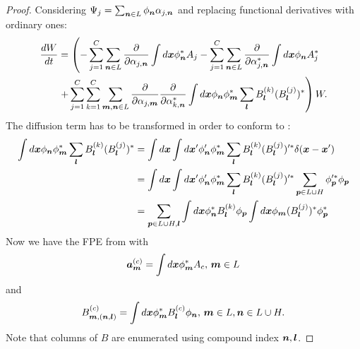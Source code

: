 \begin{proof}
Considering $\Psi_j = \sum_{\boldsymbol{n} \in L} \phi_{\boldsymbol{n}} \alpha_{j,\boldsymbol{n}}$ and replacing functional derivatives with ordinary ones:
\begin{equation*}
\begin{split}
	\frac{dW}{dt}
	& = \left(
		- \sum_{j=1}^C \sum_{\boldsymbol{n} \in L}
			\frac{\partial}{\partial \alpha_{j,\boldsymbol{n}}}
			\int d\boldsymbol{x} \phi_{\boldsymbol{n}}^* A_j
		- \sum_{j=1}^C \sum_{\boldsymbol{n} \in L}
			\frac{\partial}{\partial \alpha_{j,\boldsymbol{n}}^*}
			\int d\boldsymbol{x} \phi_{\boldsymbol{n}} A_j^*
		\right. \\
	&	\left. + \sum_{j=1}^C \sum_{k=1}^C
			\sum_{\boldsymbol{m},\boldsymbol{n} \in L}
			\frac{\partial}{\partial \alpha_{j,\boldsymbol{m}}}
			\frac{\partial}{\partial \alpha_{k,\boldsymbol{n}}^*}
			\int d\boldsymbol{x}
			\phi_{\boldsymbol{n}} \phi_{\boldsymbol{m}}^*
			\sum_{\boldsymbol{l}} B_{\boldsymbol{l}}^{(k)} (B_{\boldsymbol{l}}^{(j)})^*
	\right) W.
\end{split}
\end{equation*}
The diffusion term has to be transformed in order to conform to :
\begin{equation*}
\begin{split}
	\int d\boldsymbol{x} \phi_{\boldsymbol{n}} \phi_{\boldsymbol{m}}^* \sum_{\boldsymbol{l}} B_{\boldsymbol{l}}^{(k)} (B_{\boldsymbol{l}}^{(j)})^*
	& = \int d\boldsymbol{x} \int d\boldsymbol{x}^\prime
			\phi_{\boldsymbol{n}}^\prime \phi_{\boldsymbol{m}}^*
			\sum_{\boldsymbol{l}} B_{\boldsymbol{l}}^{(k)} (B_{\boldsymbol{l}}^{(j)})^{\prime*}
			\delta(\boldsymbol{x} - \boldsymbol{x}^\prime) \\
	& = \int d\boldsymbol{x} \int d\boldsymbol{x}^\prime
			\phi_{\boldsymbol{n}}^\prime \phi_{\boldsymbol{m}}^*
			\sum_{\boldsymbol{l}} B_{\boldsymbol{l}}^{(k)} (B_{\boldsymbol{l}}^{(j)})^{\prime*}
			\sum_{\boldsymbol{p} \in L \cup H} \phi_{\boldsymbol{p}}^{\prime*} \phi_{\boldsymbol{p}} \\
	& = \sum_{\boldsymbol{p} \in L \cup H, \boldsymbol{l}}
		\int d\boldsymbol{x}
			\phi_{\boldsymbol{n}}^* B_{\boldsymbol{l}}^{(k)} \phi_{\boldsymbol{p}}
		\int d\boldsymbol{x}
			\phi_{\boldsymbol{m}} (B_{\boldsymbol{l}}^{(j)})^* \phi_{\boldsymbol{p}}^*
\end{split}
\end{equation*}
Now we have the FPE from  with
\[
	\bm{a}_{\boldsymbol{m}}^{(c)} = \int d\boldsymbol{x} \phi_{\boldsymbol{m}}^* A_c,\,\boldsymbol{m} \in L
\]
and
\[
	B_{\boldsymbol{m},(\boldsymbol{n},\boldsymbol{l})}^{(c)} = \int d\boldsymbol{x} \phi_{\boldsymbol{m}}^* B_{\boldsymbol{l}}^{(c)} \phi_{\boldsymbol{n}},\,
	\boldsymbol{m} \in L, \boldsymbol{n} \in L \cup H.
\]
Note that columns of $B$ are enumerated using compound index $\boldsymbol{n},\boldsymbol{l}$.


\end{proof}
